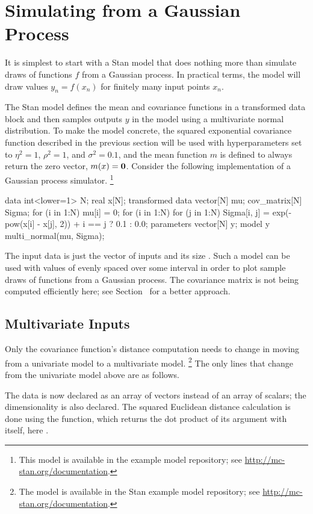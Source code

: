 \section{Simulating from a Gaussian Process}

It is simplest to start with a Stan model that does nothing more than
simulate draws of functions $f$ from a Gaussian process.  In practical
terms, the model will draw values $y_n = f(x_n)$ for finitely many
input points $x_n$.

The Stan model defines the mean and covariance functions in a
transformed data block and then samples outputs $y$ in the model using
a multivariate normal distribution.  To make the model concrete, the
squared exponential covariance function described in the previous section
will be used with hyperparameters set to $\eta^2 = 1$, $\rho^2 = 1$,
and $\sigma^2 = 0.1$, and the mean function $m$ is defined to always
return the zero vector, $m(x) = {\bf 0}$.  Consider the following
implementation of a Gaussian process simulator.%
%
\footnote{This model is available in the example model repository;
  see \url{http://mc-stan.org/documentation}.}
%
\begin{stancode}
data {
  int<lower=1> N;
  real x[N];
}
transformed data {
  vector[N] mu;
  cov_matrix[N] Sigma;
  for (i in 1:N) 
    mu[i] = 0;
  for (i in 1:N) 
    for (j in 1:N)
      Sigma[i, j] = exp(-pow(x[i] - x[j], 2)) 
                    + i == j ? 0.1 : 0.0;
}
parameters {
  vector[N] y;
}
model {
  y ~ multi_normal(mu, Sigma);
}
\end{stancode}
%
The input data is just the vector of inputs  and its size
.  Such a model can be used with values of  evenly
spaced over some interval in order to plot sample draws of functions
from a Gaussian process.  The covariance matrix  is not
being computed efficiently here; see
Section~ for a better approach.

\subsection{Multivariate Inputs}

Only the covariance function's distance computation needs to change in
moving from a univariate model to a multivariate model.%
%
\footnote{The model is available in the Stan example model repository;
see \url{http://mc-stan.org/documentation}.}
%
The only lines that change from the univariate model above are as follows.
%
\begin{stancode}
data {
  int<lower=1> D;
  int<lower=1> N;
  vector[D] x[N];
}
transformed data {
...
      Sigma[i, j] = exp(-dot_self(x[i] - x[j]))
                    + i == j ? 0.1 : 0.0;
...
\end{stancode}
%
The data is now declared as an array of vectors instead of an array of
scalars; the dimensionality  is also declared.  The squared
Euclidean distance calculation is done using the 
function, which returns the dot product of its argument with itself, here
.

